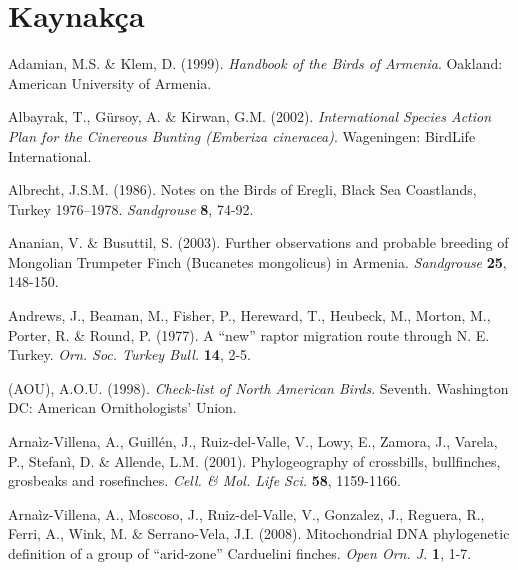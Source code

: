 \documentclass[
  10.5pt,
  a4paper,
  DIV=11,
  numbers=noendperiod,
  twocolumn]{scrreprt}
\newlength{\cslhangindent}
\newenvironment{CSLReferences}[2] %
 {\begin{list}{}{%
  \setlength{\itemindent}{0pt}
  \setlength{\leftmargin}{0pt}
  \setlength{\parsep}{0pt}
  \ifodd #1
   \setlength{\leftmargin}{\cslhangindent}
   \setlength{\itemindent}{-1\cslhangindent}
  \fi
  \setlength{\itemsep}{#2\baselineskip}}}
 {\end{list}}
\begin{document}

\chapter*{Kaynakça}\label{kaynakuxe7a}


\label{refs}
\begin{CSLReferences}{1}{1}
Adamian, M.S. \& Klem, D. (1999). \emph{{Handbook of the Birds of
Armenia}}. Oakland: American University of Armenia.

Albayrak, T., Gürsoy, A. \& Kirwan, G.M. (2002). \emph{{International
Species Action Plan for the Cinereous Bunting ({Emberiza cineracea})}}.
Wageningen: BirdLife International.

Albrecht, J.S.M. (1986). {Notes on the Birds of Eregli, Black Sea
Coastlands, Turkey 1976--1978}. \emph{Sandgrouse} \textbf{8}, 74-92.

Ananian, V. \& Busuttil, S. (2003). {Further observations and probable
breeding of Mongolian Trumpeter Finch ({Bucanetes mongolicus}) in
Armenia}. \emph{Sandgrouse} \textbf{25}, 148-150.

Andrews, J., Beaman, M., Fisher, P., Hereward, T., Heubeck, M., Morton,
M., Porter, R. \& Round, P. (1977). {A {``new''} raptor migration route
through N. E. Turkey}. \emph{Orn. Soc. Turkey Bull.} \textbf{14}, 2-5.

(AOU), A.O.U. (1998). \emph{{Check-list of North American Birds}}.
Seventh. Washington DC: American Ornithologists' Union.

Arnaìz-Villena, A., Guillén, J., Ruiz-del-Valle, V., Lowy, E., Zamora,
J., Varela, P., Stefanì, D. \& Allende, L.M. (2001). {Phylogeography of
crossbills, bullfinches, grosbeaks and rosefinches}. \emph{Cell. \& Mol.
Life Sci.} \textbf{58}, 1159-1166.

Arnaìz-Villena, A., Moscoso, J., Ruiz-del-Valle, V., Gonzalez, J.,
Reguera, R., Ferri, A., Wink, M. \& Serrano-Vela, J.I. (2008).
{Mitochondrial DNA phylogenetic definition of a group of {``arid-zone''}
Carduelini finches}. \emph{Open Orn. J.} \textbf{1}, 1-7.


\end{CSLReferences}
\end{document}
